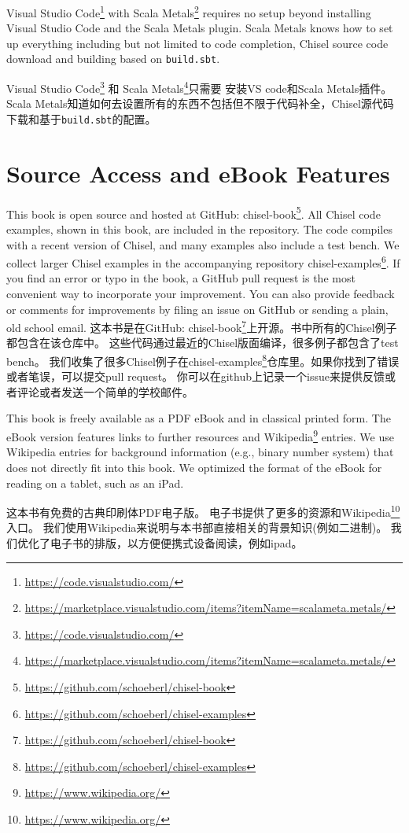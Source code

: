 \documentclass[%
    10pt,
    headinclude, footexclude,
    openright, %
    notitlepage,
    cleardoubleempty,
    headsepline,
    pointlessnumbers,
    bibtotoc, idxtotoc,
    ]{scrbook}
\newcommand{\code}[1]{{\small{\texttt{#1}}}}
\newcommand{\myref}[2]{\href{#1}{#2}}
\renewcommand{\myref}[2]{{#2}{\footnote{\url{#1}}}}
\begin{document}
\myref{https://code.visualstudio.com/}{Visual Studio Code} with
\myref{https://marketplace.visualstudio.com/items?itemName=scalameta.metals/}{Scala Metals} requires
no setup beyond installing Visual Studio Code and the Scala Metals plugin. Scala Metals knows how to
set up everything including but not limited to code completion, Chisel source code download and
building based on \code{build.sbt}.

\myref{https://code.visualstudio.com/}{Visual Studio Code} 和
\myref{https://marketplace.visualstudio.com/items?itemName=scalameta.metals/}{Scala Metals}只需要
 安装VS code和Scala Metals插件。Scala Metals知道如何去设置所有的东西不包括但不限于代码补全，Chisel源代码下载和基于\code{build.sbt}的配置。

\section{Source Access and eBook Features}

This book is open source and hosted at GitHub: \myref{https://github.com/schoeberl/chisel-book}{chisel-book}.
All Chisel code examples, shown in this book, are included in the repository.
The code compiles with a recent version of Chisel, and many examples also include a test bench.
We collect larger Chisel examples in the accompanying repository \myref{https://github.com/schoeberl/chisel-examples}{chisel-examples}. If you find an error or typo in the book, a GitHub pull request is the most convenient way to incorporate your improvement.
You can also provide feedback or comments for improvements by filing an issue on GitHub
or sending a plain, old school email.
这本书是在GitHub: \myref{https://github.com/schoeberl/chisel-book}{chisel-book}上开源。书中所有的Chisel例子都包含在该仓库中。
这些代码通过最近的Chisel版面编译，很多例子都包含了test bench。
我们收集了很多Chisel例子在\myref{https://github.com/schoeberl/chisel-examples}{chisel-examples}仓库里。如果你找到了错误或者笔误，可以提交pull request。
你可以在github上记录一个issue来提供反馈或者评论或者发送一个简单的学校邮件。


This book is freely available as a PDF eBook and in classical printed form.
The eBook version features links to further resources
and \myref{https://www.wikipedia.org/}{Wikipedia} entries.
We use Wikipedia entries for background information (e.g., binary number system)
that does not directly fit into this book.
We optimized the format of the eBook for reading on a tablet, such as an iPad.

这本书有免费的古典印刷体PDF电子版。
电子书提供了更多的资源和\myref{https://www.wikipedia.org/}{Wikipedia}入口。
我们使用Wikipedia来说明与本书部直接相关的背景知识(例如二进制)。
我们优化了电子书的排版，以方便便携式设备阅读，例如ipad。
\end{document}
